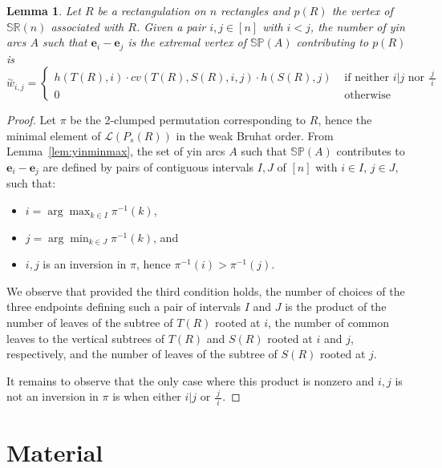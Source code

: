 \documentclass{amsart}
\newtheorem{lemma}[theorem]{Lemma}
\theoremstyle{definition}
\newcommand{\polytope}[1]{\mathds{#1}} %
\newcommand{\SRP}{\polytope{SR}} %
\newcommand{\SP}{\polytope{SP}}
\newcommand{\yin}[1]{\overset{\sim}{#1}}
\begin{document}
\begin{lemma}
  Let $R$ be a rectangulation on $n$ rectangles and $p(R)$ the vertex of $\SRP(n)$ associated with $R$.
  Given a pair $i,j\in [n]$ with $i<j$, the number of yin arcs $A$ such that $\mathbf{e}_i-\mathbf{e}_j$
  is the extremal vertex of $\SP(A)$ contributing to $p(R)$ is
  \[
  \yin{w}_{i,j} = 
  \begin{cases}
    h(T(R), i) \cdot cv (T(R), S(R), i, j)\cdot h(S(R), j) & \text{ if neither } i|j \text{ nor } \frac{\ j\ }i \\
    0 & \text{ otherwise }
  \end{cases}
  \]
\end{lemma}
\begin{proof}
  Let $\pi$ be the 2-clumped permutation corresponding to $R$, hence the minimal element of $\mathcal{L}(P_s(R))$ in the weak Bruhat order.
  From Lemma~\ref{lem:yinminmax}, the set of yin arcs $A$ such that $\SP(A)$ contributes to $\mathbf{e}_i-\mathbf{e}_j$
  are defined by pairs of contiguous intervals $I,J$ of $[n]$ with $i\in I$, $j\in J$, such that:
  \begin{itemize}
  \item $i = \arg\max_{k\in I} \pi^{-1}(k)$,
  \item $j = \arg\min_{k\in J} \pi^{-1}(k)$, and
  \item $i,j$ is an inversion in $\pi$, hence $\pi^{-1}(i)>\pi^{-1}(j)$.
  \end{itemize}
  We observe that provided the third condition holds, the number of choices of the three endpoints defining such a pair of intervals $I$ and $J$ is the product of the
  number of leaves of the subtree of $T(R)$ rooted at $i$, the number of common leaves to the vertical subtrees of $T(R)$ and $S(R)$ rooted
  at $i$ and $j$, respectively, and the number of leaves of the subtree of $S(R)$ rooted at $j$.
  
  It remains to observe that the only case where this product is nonzero and $i,j$ is not an inversion in $\pi$ is when either $i|j$ or $\frac{\ j\ }i$.
\end{proof}


{}


\label{sec:biblio}


\newpage
\appendix
\section{Material}
\end{document}
